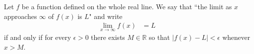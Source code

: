 
\begin{frame}
\vfill
\alert<1|handout:0>{  Let $f$ be a function defined on the whole real line. } \pause
 \alert<2|handout:0>{ We say that
``the limit as $x$ approaches $\infty$ of $f(x)$ is $L$"
and write
\begin{align*}
  \lim_{x \to \infty} f(x) &= L
\end{align*}}\pause
\alert<3|handout:0>{if and only if for every $\epsilon>0$} \pause
\alert<4|handout:0>{there exists $M \in \mathbb{R}$ so that
${|f(x)-L| < \epsilon}$ whenever $x>M$.}
\end{frame}


